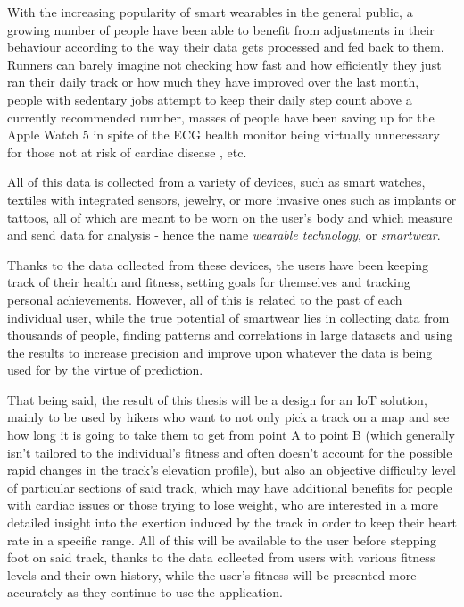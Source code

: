 \linebreak
With the increasing popularity of smart wearables in the general public, a growing number of people have been able to benefit from adjustments in their behaviour according to the way their data gets processed and fed back to them.
Runners can barely imagine not checking how fast and how efficiently they just ran their daily track or how much they have improved over the last month,
people with sedentary jobs attempt to keep their daily step count above a currently recommended number,
masses of people have been saving up for the Apple Watch 5 \cite{AppleWatch5} in spite of the ECG health monitor being virtually unnecessary for those not at risk of cardiac disease \cite{ecg-screening}, etc.

All of this data is collected from a variety of devices, such as smart watches, textiles with integrated sensors, jewelry, or more invasive ones such as implants or tattoos, all of which are meant to be worn on the user's body and which measure and send data for analysis - hence the name \textit{wearable technology}, or \textit{smartwear}. \cite{what-is-wearable-tech}

Thanks to the data collected from these devices, the users have been keeping track of their health and fitness, setting goals for themselves and tracking personal achievements.
However, all of this is related to the past of each individual user, while the true potential of smartwear lies in collecting data from thousands of people,
finding patterns and correlations in large datasets and using the results to increase precision and improve upon whatever the data is being used for by the virtue of prediction.

That being said, the result of this thesis will be a design for an IoT solution, mainly to be used by hikers who want to not only pick a track on a map and see how long it is going to take them to get from point A to point B (which generally isn't tailored to the individual's fitness and often doesn't account for the possible rapid changes in the track's elevation profile),
but also an objective difficulty level of particular sections of said track, which may have additional benefits for people with cardiac issues or those trying to lose weight, who are interested in a more detailed insight into the exertion induced by the track in order to keep their heart rate in a specific range.
All of this will be available to the user before stepping foot on said track, thanks to the data collected from users with various fitness levels and their own history,
while the user's fitness will be presented more accurately as they continue to use the application.

